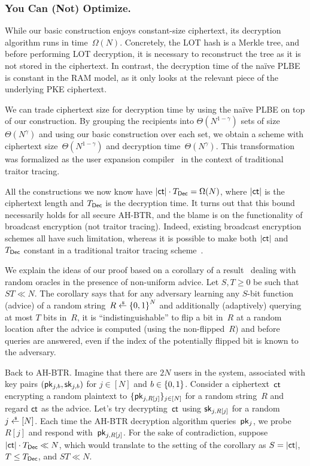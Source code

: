 \subsubsection{You Can (Not) Optimize.}
While our basic construction enjoys constant-size ciphertext,
its decryption algorithm runs in time~$\Omega(N)$.
Concretely, the LOT hash is a Merkle tree, and before performing LOT decryption, it is necessary to reconstruct the tree as it is not stored in the ciphertext.
In contrast, the decryption time of the na{\"i}ve PLBE is constant in the RAM model, as it only looks at the relevant piece of the underlying PKE ciphertext.

We can trade ciphertext size for decryption time by using the na{\"i}ve PLBE on top of our construction.
By grouping the recipients into $\Theta(N^{1-\gamma})$ sets of size~$\Theta(N^\gamma)$ and using our basic construction over each set, we obtain a scheme with ciphertext size~$\Theta(N^{1-\gamma})$ and decryption time~$\Theta(N^\gamma)$.
This transformation was formalized as the user expansion compiler~\cite{C:Zhandry20} in the context of traditional traitor tracing.

All the constructions we now know have ${|\ct|\cdot\TDec=\Omega(N)}$,
where $|\ct|$ is the ciphertext length and $\TDec$ is the decryption time.
It turns out that this bound necessarily holds for all secure AH-BTR, and
the blame is on the functionality of broadcast encryption (not traitor tracing).
Indeed, existing broadcast encryption schemes all have such limitation, whereas
it is possible to make both $|\ct|$ and $\TDec$ constant in a traditional traitor tracing scheme~\cite{C:BonZha14}.

We explain the ideas of our proof based on a corollary of a result~\cite{C:Unruh07} dealing with random oracles in the presence of non-uniform advice.
Let ${S,T\geq 0}$ be such that ${ST\ll N}$.
The corollary says that
for any adversary learning any $S$-bit function (advice) of a random string~${R\draws\bit^N}$ and additionally (adaptively) querying at most $T$ bits in~$R$,
it is ``indistinguishable'' to flip a bit in~$R$ at a random location
after the advice is computed (using the non-flipped~$R$) and
before queries are answered,
even if the index of the potentially flipped bit is known to the adversary.

Back to AH-BTR. Imagine that there are $2N$ users in the system, associated with key pairs $(\pk_{j,b},\sk_{j,b})$ for ${j\in[N]}$ and ${b\in{\{0,1\}}}$.
Consider a ciphertext~$\ct$ encrypting a random plaintext to $\{\pk_{j,R[j]}\}_{j\in[N]}$ for a random string~$R$ and
regard $\ct$ as the advice.
Let's try decrypting~$\ct$ using $\sk_{j,R[j]}$ for a random ${j\draws[N]}$.
Each time the AH-BTR decryption algorithm queries~$\pk_j$,
we probe $R[j]$ and respond with~$\pk_{j,R[j]}$.
For the sake of contradiction, suppose ${|\ct|\cdot\TDec\ll N}$,
which would translate to the setting of the corollary as ${S=|\ct|}$, ${T\leq\TDec}$, and ${ST\ll N}$.

